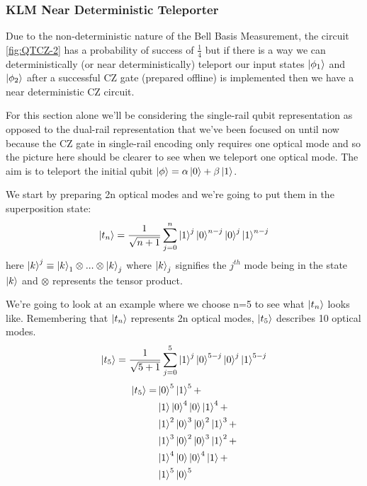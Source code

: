 \subsubsection{KLM Near Deterministic Teleporter}
Due to the non-deterministic nature of the Bell Basis Measurement, the circuit \cref{fig:QTCZ-2} has a probability of success of $\frac{1}{4}$ but if there is a way we can deterministically (or near deterministically) teleport our input states $\ket{\phi_1}$ and $\ket{\phi_2}$ after a successful CZ gate (prepared offline) is implemented then we have a near deterministic CZ circuit.
\par
For this section alone we'll be considering the single-rail qubit representation as opposed to the dual-rail representation that we've been focused on until now because the CZ gate in single-rail encoding only requires one optical mode and so the picture here should be clearer to see when we teleport one optical mode. The aim is to teleport the initial qubit $\ket{\phi} = \alpha\ket{0} + \beta\ket{1}$.
\par
We start by preparing 2n optical modes and we're going to put them in the superposition state:
    \begin{equation}
        \ket{t_n} = \frac{1}{\sqrt{n+1}}\sum\limits_{j=0}^{n}\ket{1}^j\ket{0}^{n-j}\ket{0}^j\ket{1}^{n-j}
        \label{eqn: QFT Teleporter EQ}
    \end{equation} \cite{KnillE2001Asfe}\cite{Kok:2005jip}
here $\ket{k}^j \equiv \ket{k}_1 \otimes...\otimes\ket{k}_j$ where $\ket{k}_j$ signifies the $j^{th}$ mode being in the state $\ket{k}$ and $\otimes$ represents the tensor product. 
\par
We're going to look at an example where we choose n=5 to see what $\ket{t_n}$ looks like. Remembering that $\ket{t_n}$ represents 2n optical modes, $\ket{t_5}$ describes 10 optical modes.
\begin{equation}
        \ket{t_5} = \frac{1}{\sqrt{5+1}}\sum\limits_{j=0}^5\ket{1}^j\ket{0}^{5-j}\ket{0}^j\ket{1}^{5-j}
    \end{equation}
    \begin{align} 
        \ket{t_5} =  & \ket{0}^{5}\ket{1}^5 
        + \\ & \ket{1}\ket{0}^{4}\ket{0}\ket{1}^{4} + 
 \\ & \ket{1}^2\ket{0}^{3}\ket{0}^2\ket{1}^{3} \label{t5:1} + \\ & \ket{1}^3\ket{0}^{2}\ket{0}^3\ket{1}^{2}\label{t5:2} + \\  & \ket{1}^4\ket{0}\ket{0}^4\ket{1} + \\ & \ket{1}^{5}\ket{0}^5  
 \label{eqn: t5 breakdown}
\end{align}
